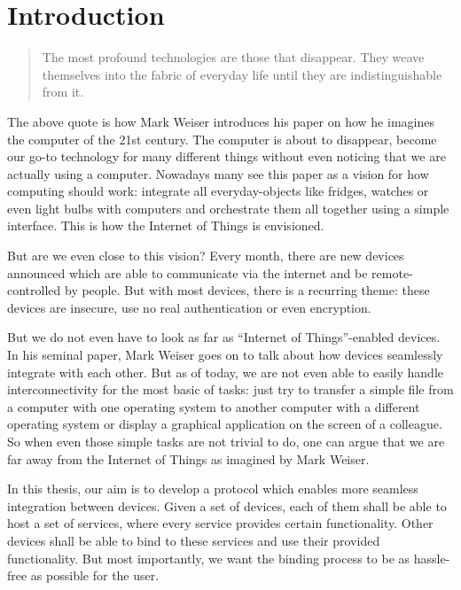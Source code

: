 \chapter{Introduction}

\begin{quote}
    The most profound technologies are those that disappear.
    They weave themselves into the fabric of everyday life until they are indistinguishable from it. \cite{weiser1991computer}
\end{quote}

The above quote is how Mark Weiser introduces his paper on how he imagines the computer of the 21st century.
The computer is about to disappear, become our go-to technology for many different things without even noticing that we are actually using a computer.
Nowadays many see this paper as a vision for how computing should work: integrate all everyday-objects like fridges, watches or even light bulbs with computers and orchestrate them all together using a simple interface.
This is how the Internet of Things is envisioned.

But are we even close to this vision?
Every month, there are new devices announced which are able to communicate via the internet and be remote-controlled by people.
But with most devices, there is a recurring theme: these devices are insecure, use no real authentication or even encryption.

But we do not even have to look as far as ``Internet of Things''-enabled devices.
In his seminal paper, Mark Weiser goes on to talk about how devices seamlessly integrate with each other.
But as of today, we are not even able to easily handle interconnectivity for the most basic of tasks: just try to transfer a simple file from a computer with one operating system to another computer with a different operating system or display a graphical application on the screen of a colleague.
So when even those simple tasks are not trivial to do, one can argue that we are far away from the Internet of Things as imagined by Mark Weiser.

In this thesis, our aim is to develop a protocol which enables more seamless integration between devices.
Given a set of devices, each of them shall be able to host a set of services, where every service provides certain functionality.
Other devices shall be able to bind to these services and use their provided functionality.
But most importantly, we want the binding process to be as hassle-free as possible for the user.

